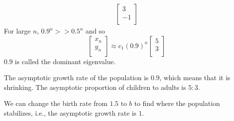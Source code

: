 \documentclass{article}
\begin{document}
\begin{example}
\begin{align*}
\begin{bmatrix}
          3\\-1\\
        \end{bmatrix}
      \end{align*}
      For large $n$, $0.9^n >> 0.5^n$ and so \[
        \begin{bmatrix}
          x_n\\y_n\\
        \end{bmatrix} \approx c_1(0.9)^n
        \begin{bmatrix}
          5\\3\\
        \end{bmatrix}
      \]
      $0.9$ is called the dominant eigenvalue.

      The asymptotic growth rate of the population is $0.9$, which means that it is shrinking. The asymptotic proportion of children to adults is $5:3$.

      We can change the birth rate from $1.5$ to $b$ to find where the population stabilizes, i.e., the asymptotic growth rate is $1$.


\end{example}
\end{document}
